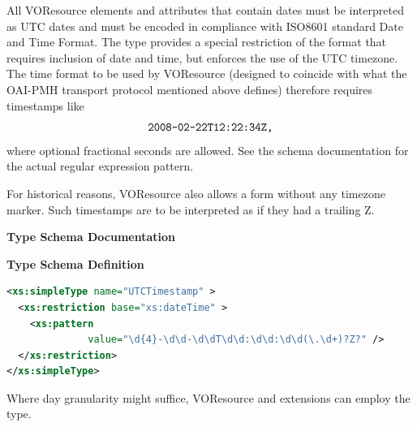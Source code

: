 \documentclass[11pt,a4paper]{ivoa}
\begin{document}
All VOResource elements and attributes that contain dates must be
interpreted as UTC dates and must be encoded in compliance with ISO8601
\citep{std:iso8601}
standard Date and Time Format.  The  type
provides a special restriction of the format that requires inclusion of
date and time, but enforces the use of the UTC timezone.  The time
format to be used by VOResource (designed to coincide with
what the OAI-PMH transport protocol mentioned above defines)
therefore requires timestamps like
$$\hbox{\texttt{2008-02-22T12:22:34Z,}}$$
where optional fractional seconds are allowed.  See the schema
documentation for the actual regular expression pattern.

For historical reasons, VOResource also allows a form without any
timezone marker.  Such timestamps are to be interpreted as  if they had
a trailing Z.

\begin{generated}
\begingroup
      	\renewcommand*\descriptionlabel[1]{%
      	\hbox to 5.5em{\emph{#1}\hfil}}\vspace{2ex}\noindent\textbf{ Type Schema Documentation}


\vspace{1ex}\noindent\textbf{ Type Schema Definition}

\begin{lstlisting}[language=XML,basicstyle=\footnotesize]
<xs:simpleType name="UTCTimestamp" >
  <xs:restriction base="xs:dateTime" >
    <xs:pattern
              value="\d{4}-\d\d-\d\dT\d\d:\d\d:\d\d(\.\d+)?Z?" />
  </xs:restriction>
</xs:simpleType>
\end{lstlisting}\endgroup
\end{generated}



Where day granularity might suffice, VOResource and extensions can
employ the  type.
\end{document}
